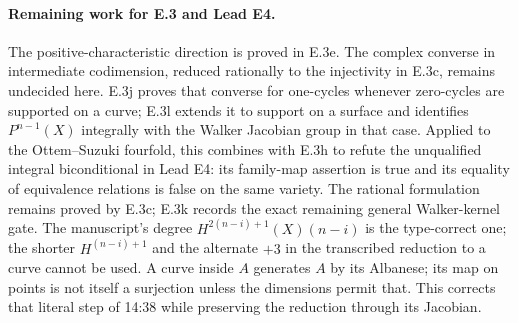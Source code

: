 \paragraph{Remaining work for E.3 and Lead E4.}
The positive-characteristic direction is proved in E.3e.
The complex converse in intermediate codimension, reduced
rationally to the injectivity in E.3c, remains undecided here.
E.3j proves that converse for one-cycles whenever zero-cycles are
supported on a curve; E.3l extends it to support on a surface
and identifies $P^{n-1}(X)$ integrally with the Walker Jacobian
group in that case. Applied to the Ottem--Suzuki fourfold,
this combines with E.3h to refute the unqualified integral
biconditional in Lead E4: its family-map assertion is true and
its equality of equivalence relations is false on the same
variety. The rational formulation remains proved by E.3c;
E.3k records the exact remaining general Walker-kernel gate.
The manuscript's degree
$H^{2(n-i)+1}(X)(n-i)$ is the type-correct one; the shorter
$H^{(n-i)+1}$ and the alternate $+3$ in the transcribed reduction
to a curve cannot be used. A curve inside $A$ generates $A$ by
its Albanese; its map on points is not itself a surjection unless
the dimensions permit that. This corrects that literal step of
14:38 while preserving the reduction through its Jacobian.
